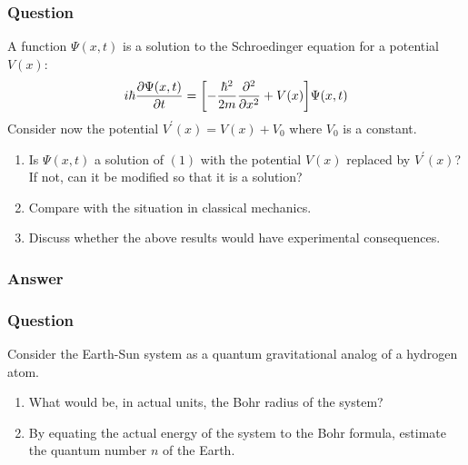 \subsubsection{Question}
A function $\Psi(x,t)$ is a solution to the Schroedinger equation for a potential $V(x)$:
\begin{equation*}
	i\hbar\pdv{\Psi(x,t)}{t} = \qty[-\frac{\hbar^2}{2m}\pdv[2]{x} + V(x)]\Psi(x,t)
\end{equation*}
Consider now the potential $V^\prime(x) = V(x)+V_0$ where $V_0$ is a constant.
\begin{enumerate}
	\item Is $\Psi(x,t)$ a solution of $(1)$ with the potential $V(x)$ replaced by $V^\prime(x)$? If not, can it be modified so that it is a solution?
	\item Compare with the situation in classical mechanics.
	\item Discuss whether the above results would have experimental consequences. 
\end{enumerate}

\subsubsection{Answer}


\subsubsection{Question}
Consider the Earth-Sun system as a quantum gravitational analog of a hydrogen atom.
\begin{enumerate}
	\item What would be, in actual units, the Bohr radius of the system?
	\item By equating the actual energy of the system to the Bohr formula, estimate the quantum number $n$ of the Earth.
\end{enumerate}

